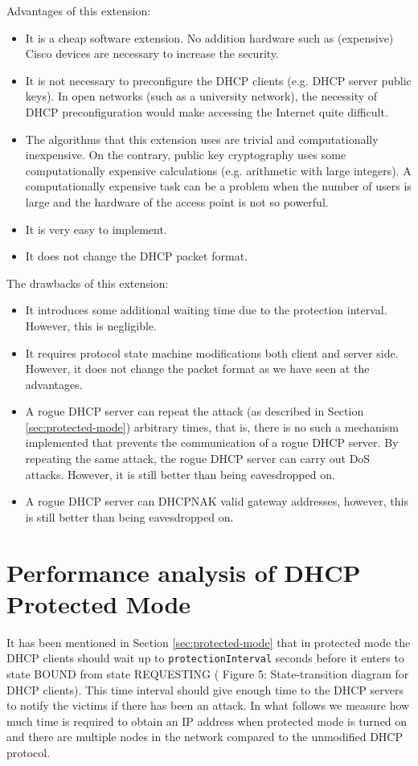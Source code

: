 \documentclass[letterpaper, 10 pt, conference]{ieeeconf}  %
\begin{document}
Advantages of this extension:
\begin{itemize}
\item It is a cheap software extension. No addition hardware such as (expensive) Cisco devices are necessary to increase the security.
\item It is not necessary to preconfigure the DHCP clients (e.g. DHCP server public keys). In open networks (such as a university network), the necessity of DHCP preconfiguration would make accessing the Internet quite difficult.
\item The algorithms that this extension uses are trivial and computationally inexpensive. On the contrary, public key cryptography uses some computationally expensive calculations (e.g. arithmetic with large integers). A computationally expensive task can be a problem when the number of users is large and the hardware of the access point is not so powerful.
\item It is very easy to implement.
\item It does not change the DHCP packet format.
\end{itemize}

The drawbacks of this extension:
\begin{itemize}
\item It introduces some additional waiting time due to the protection interval. However, this is negligible.
\item It requires protocol state machine modifications both client and server side. However, it does not change the packet format as we have seen at the advantages.
\item A rogue DHCP server can repeat the attack (as described in Section \ref{sec:protected-mode}) arbitrary times, that is, there is no such a mechanism implemented that prevents the communication of a rogue DHCP server. By repeating the same attack, the rogue DHCP server can carry out DoS attacks. However, it is still better than being eavesdropped on.
\item A rogue DHCP server can DHCPNAK valid gateway addresses, however, this is still better than being eavesdropped on.
\end{itemize}
\section{Performance analysis of DHCP Protected Mode}
It has been mentioned in Section \ref{sec:protected-mode} that in protected mode the DHCP clients should wait up to \texttt{protectionInterval} seconds before it enters to state BOUND from state REQUESTING (\cite{dhcprfc} Figure 5:  State-transition diagram for DHCP clients). This time interval should give enough time to the DHCP servers to notify the victims if there has been an attack. In what follows we measure how much time is required to obtain an IP address when protected mode is turned on and there are multiple nodes in the network compared to the unmodified DHCP protocol.
\end{document}
